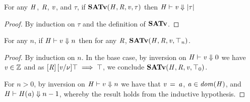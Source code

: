 \begin{lemma}
  \label{lem:sat-implies-shape-cons}
  For any $\mathit{H}$, $\mathit{R}$, $\mathit{v}$, and $\tau$, if $ \mathbf{SATv} ( \mathit{H} , \mathit{R} , \mathit{v} , \tau ) $ then $ \mathit{H} \vdash   \mathit{v}  \Downarrow   | \tau |  $
\end{lemma}
\begin{proof}
  By induction on $\tau$ and the definition of $\mathbf{SATv}$.
\end{proof}

\begin{lemma} %
  \label{lem:top-type-sat-all}
  For any $n$, if $ \mathit{H} \vdash   v  \Downarrow  n $ then for any $\mathit{R}$, $ \mathbf{SATv} ( \mathit{H} , \mathit{R} , \mathit{v} , \top_{\mathit{n}} ) $.
\end{lemma}
\begin{proof}
  By induction on $n$. In the base case, by inversion on $ \mathit{H} \vdash   \mathit{v}  \Downarrow  0 $ we have
  $ \mathit{v}  \in  \mathbb{Z} $ and as $[  \mathit{R}  ] \, [  \mathit{v}  /  \nu  ]   \top   \implies   \top $, we conclude $ \mathbf{SATv} ( \mathit{H} , \mathit{R} , \mathit{v} , \top_{{\mathrm{0}}} ) $.

  For $n > 0$, by inversion on $ \mathit{H} \vdash   v  \Downarrow  n $ we have that
  $\mathit{v} \, = \, \mathit{a}$, $ \mathit{a}  \in   \mathit{dom}( \mathit{H} )  $, and $ \mathit{H} \vdash   \mathit{H}  (  \mathit{a}  )  \Downarrow  n  -  1 $,
  whereby the result holds from the inductive hypothesis.
\end{proof}
  

